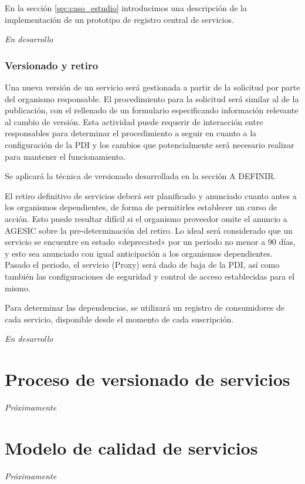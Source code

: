 \documentclass[11pt]{article}
\begin{document}
				En la sección \ref{sec:caso_estudio} introducimos una descripción de la implementación de un prototipo de registro central de servicios.

				\emph{En desarrollo}

			\subsubsection{Versionado y retiro}
				Una nueva versión de un servicio será gestionada a partir de la solicitud por parte del organismo responsable. El procedimiento para la solicitud será similar al de la publicación, con el rellenado de un formulario especificando información relevante al cambio de versión. Esta actividad puede requerir de interacción entre responsables para determinar el procedimiento a seguir en cuanto a la configuración de la PDI y los cambios que potencialmente será necesario realizar para mantener el funcionamiento.

				Se aplicará la técnica de versionado desarrollada en la sección A DEFINIR.

				El retiro definitivo de servicios deberá ser planificado y anunciado cuanto antes a los organismos dependientes, de forma de permitirles establecer un curso de acción. Esto puede resultar difícil si el organismo proveedor omite el anuncio a AGESIC sobre la pre-determinación del retiro. Lo ideal será considerado que un servicio se encuentre en estado «deprecated» por un periodo no menor a 90 días, y esto sea anunciado con igual anticipación a los organismos dependientes. Pasado el periodo, el servicio (Proxy) será dado de baja de la PDI, así como también las configuraciones de seguridad y control de acceso establecidas para el mismo.

				Para determinar las dependencias, se utilizará un registro de consumidores de cada servicio, disponible desde el momento de cada suscripción.

				\emph{En desarrollo}

	\section{Proceso de versionado de servicios}
		\label{sec:versionado}
		\emph{Próximamente}

	\section{Modelo de calidad de servicios}
		\label{sec:calidad}
		\emph{Próximamente}
\end{document}
